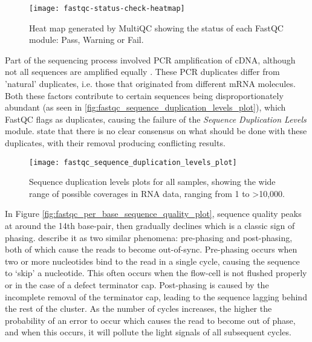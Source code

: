 \newpage
\begin{figure}[!h]
    \centering
    \texttt{[image: fastqc-status-check-heatmap]}
    \caption[Heat map showing the status of each FastQC module]{Heat map generated by MultiQC showing the status of each FastQC module: Pass, Warning or Fail.} 
    \label{fig:fastqc-status-check-heatmap}
\end{figure}

\newpage
Part of the sequencing process involved PCR amplification of cDNA, although not all sequences are amplified equally \citep{kozarewa2009amplification}. These PCR duplicates differ from 'natural' duplicates, i.e. those that originated from different mRNA molecules. Both these factors contribute to certain sequences being disproportionately abundant (as seen in \autoref{fig:fastqc_sequence_duplication_levels_plot}), which FastQC flags as duplicates, causing the failure of the \textit{Sequence Duplication Levels} module. \cite{parekh2016impact} state that there is no clear consensus on what should be done with these duplicates, with their removal producing conflicting results.

\begin{figure}[!h]
    \centering
    \texttt{[image: fastqc\_sequence\_duplication\_levels\_plot]}
    \caption[Sequence duplication levels plots for all samples]{Sequence duplication levels plots for all samples, showing the wide range of possible coverages in RNA data, ranging from 1 to >10,000.} 
    \label{fig:fastqc_sequence_duplication_levels_plot}
\end{figure}

\newpage
In Figure \ref{fig:fastqc_per_base_sequence_quality_plot}, sequence quality peaks at around the 14th base-pair, then gradually declines which is a classic sign of phasing. \cite{pfeiffer2018systematic} describe it as two similar phenomena: pre-phasing and post-phasing, both of which cause the reads to become out-of-sync. Pre-phasing occurs when two or more nucleotides bind to the read in a single cycle, causing the sequence to ‘skip’ a nucleotide. This often occurs when the flow-cell is not flushed properly or in the case of a defect terminator cap. Post-phasing is caused by the incomplete removal of the terminator cap, leading to the sequence lagging behind the rest of the cluster. As the number of cycles increases, the higher the probability of an error to occur which causes the read to become out of phase, and when this occurs, it will pollute the light signals of all subsequent cycles.


